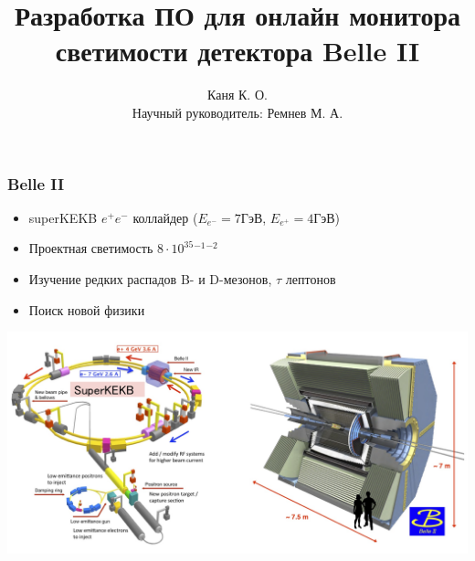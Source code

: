 \documentclass{beamer}
\title{Разработка ПО для онлайн монитора светимости детектора Belle II}
\author{Каня К. О. \\
    Научный руководитель: Ремнев М. А.}
\institute{Новосибирский Государственный Университет}
\begin{document}
\begin{frame}
\titlepage
\end{frame}

\begin{frame}
\frametitle{Belle II}
  \begin{itemize}
    \item superKEKB $e^+e^-$ коллайдер ($E_{e^-}=7$ГэВ, $E_{e^+}=4$ГэВ)
    \item Проектная светимость $8\cdot10^{35}$$^{-1}$$^{-2}$
    \item Изучение редких распадов B- и D-мезонов, $\tau$ лептонов
    \item Поиск новой физики
  \end{itemize}
  \includegraphics[width=\textwidth]{SuperKEKB_BelleII.jpg}
\end{frame}
\end{document}
